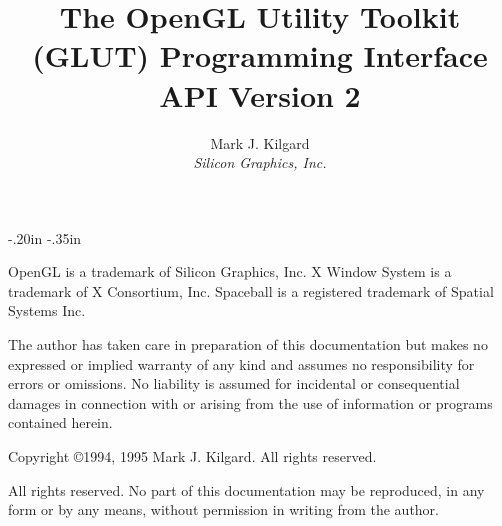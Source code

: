 

\topmargin -0.3in
\headheight 10pt
\headsep 15pt
\oddsidemargin -.20in
\evensidemargin -.35in
\textwidth 7.1in
\textheight 9in
\makeindex



\def\rndx#1{{\index{#1}\tt #1}}
\def\ndx#1{{\index{#1}#1}}

\pagestyle{headings}

\def\resetNote{\setcounter{NoteNum}{0}}
\def\takeNote{\addtocounter{NoteNum}{1}(\theNoteNum)}
\def\sameNote{(\theNoteNum)}

\title{ 
{\huge
The OpenGL Utility Toolkit (GLUT) Programming Interface} \\
\vspace{.4in}
API Version 2}
\author{Mark J. Kilgard \\
{\em Silicon Graphics, Inc.}}

\maketitle



OpenGL is a trademark of Silicon Graphics, Inc.  X Window System is
a trademark of X Consortium, Inc.  Spaceball is a registered trademark
of Spatial Systems Inc.

The author has taken care in preparation of this documentation but makes no
expressed or implied warranty of any kind and assumes no 
responsibility for errors or omissions.  No liability is assumed
for incidental or consequential damages in connection with or arising
from the use of information or programs contained herein.

\vspace{.5in}

\begin{center}
Copyright \copyright 1994, 1995 Mark J. Kilgard.  All rights reserved.
\end{center}

\vspace{.5in}

All rights reserved.  No part of this documentation may be reproduced,
in any form or by any means, without permission in writing from the author.

